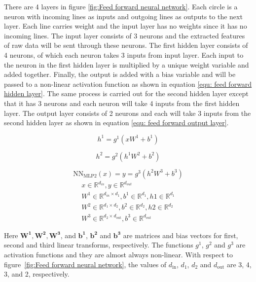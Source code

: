 \documentclass[a4paper, 11pt]{article}
\begin{document}
There are 4 layers in figure \ref{fig:Feed forward neural network}. Each circle is a neuron with incoming lines as inputs and outgoing lines as outputs to the next layer. Each line carries weight and the input layer has no weights since it has no incoming lines. The input layer consists of 3 neurons and the extracted features of raw data will be sent through these neurons. The first hidden layer consists of 4 neurons, of which each neuron takes 3 inputs from input layer. Each input to the neuron in the first hidden layer is multiplied by a unique weight variable and added together.  Finally, the output is added with a bias variable and will be passed to a non-linear activation function as shown in equation \ref{equ: feed forward hidden layer}. The same process is carried out for the second hidden layer except that it has 3 neurons and each neuron will take 4 inputs from the first hidden layer. The output layer consists of 2 neurons and each will take 3 inputs from the second hidden layer as shown in equation \ref{equ: feed forward output layer}.

\begin{equation} \label{equ: feed forward hidden layer}
h^1 = g^1(xW^1 + b^1)
\end{equation}

\begin{equation}
h^2 = g^2(h^1W^2 + b^2)
\end{equation}

\begin{equation} \label{equ: feed forward output layer}
\mathrm{NN_{MLP2}}(x) = y = g^3(h^2W^3 + b^3)
\end{equation}
\begin{align*}
x \in \mathbb{R}^{d_{in}}, y \in \mathbb{R}^{d_{out}} \\
W^1 \in \mathbb{R}^{d_{in} \times d_1}, b^1 \in \mathbb{R}^{d_1}, h1 \in \mathbb{R}^{d_{1}} \\
W^2 \in \mathbb{R}^{d_1 \times d_2}, b^2 \in \mathbb{R}^{d_2}, h2 \in \mathbb{R}^{d_{2}}\\
W^3 \in \mathbb{R}^{d_2 \times d_\mathrm{out}}, b^3 \in \mathbb{R}^{d_{out}}
\end{align*}

Here $\mathbf{W^1, W^2, W^3}$,  and $\mathbf{b^1}$, $\mathbf{b^2}$ and $\mathbf{b^3}$ are matrices and bias vectors for first, second and third linear transforms, respectively. The functions $g^1$, $g^2$ and $g^3$ are activation functions and they are almost always non-linear. With respect to figure~\ref{fig:Feed forward neural network}, the values of $d_\mathrm{in}$, $d_{1}$, $d_{2}$ and $d_\mathrm{out}$ are 3, 4, 3, and 2, respectively. 
\end{document}
